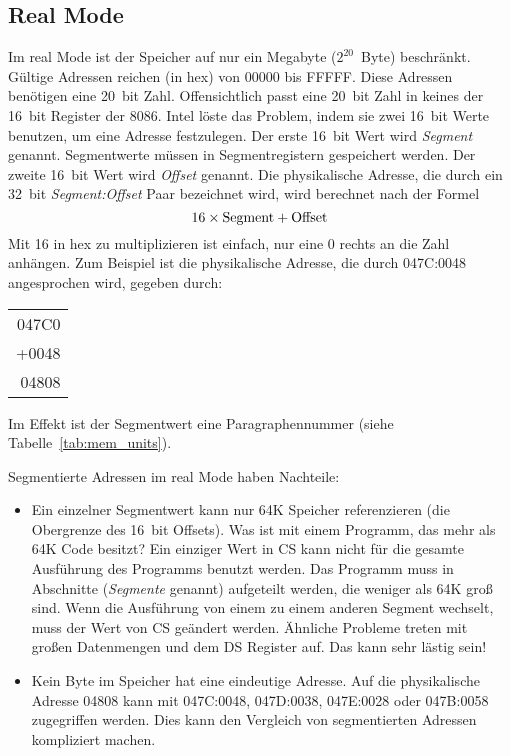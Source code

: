 \subsection{Real Mode \label{sec:real_mode} }

Im  real Mode ist der Speicher auf nur ein
Megabyte ($2^{20}$~Byte) beschr\"{a}nkt. G\"{u}ltige Adressen reichen (in
hex) von 00000 bis FFFFF.\@  %
Diese Adressen ben\"{o}tigen eine 20~bit Zahl. Offensichtlich passt eine
20~bit Zahl in keines der 16~bit Register der 8086. Intel l\"{o}ste das
Problem, indem sie zwei 16~bit Werte benutzen, um eine Adresse
festzulegen. Der erste 16~bit Wert wird \emph{Segment} genannt.
Segmentwerte m\"{u}ssen in Segmentregistern gespeichert werden. Der
zweite 16~bit Wert wird \emph{Offset} genannt. Die physikalische
Adresse, die durch ein 32~bit \emph{Segment:Offset} Paar bezeichnet
wird, wird berechnet nach der Formel
\[ 16 \times {\rm Segment} + {\rm Offset} \]
Mit 16 in hex zu multiplizieren ist einfach, nur eine 0 rechts an
die Zahl anh\"{a}ngen. Zum Beispiel ist die physikalische Adresse, die
durch 047C:0048 angesprochen wird, gegeben durch:
\begin{center}
\begin{tabular}{r}
 047C0 \\
 +0048 \\
\hline
 04808 \\
\end{tabular}
\end{center}
Im Effekt ist der Segmentwert eine Paragraphennummer (siehe
Tabelle~\ref{tab:mem_units}).

Segmentierte Adressen im real Mode haben Nachteile:
\begin{itemize}
\parskip=-0.25em %

\item Ein einzelner Segmentwert kann nur 64K Speicher referenzieren (die
Obergrenze des 16~bit Offsets). Was ist mit einem Programm, das mehr
als 64K Code besitzt? Ein einziger Wert in CS kann nicht f\"{u}r die
gesamte Ausf\"{u}hrung des Programms benutzt werden. Das Programm muss
in Abschnitte (\emph{Segmente}  genannt)
aufgeteilt werden, die weniger als 64K gro{\ss} sind. Wenn die
Ausf\"{u}hrung von einem zu einem anderen Segment wechselt, muss der
Wert von CS ge\"{a}ndert werden. \"{A}hnliche Probleme treten mit gro{\ss}en
Datenmengen und dem DS Register auf. Das kann sehr l\"{a}stig sein!

\item Kein Byte im Speicher hat eine eindeutige Adresse. Auf die
physikalische Adresse 04808 kann mit 047C:0048, 047D:0038, 047E:0028
oder 047B:0058 zugegriffen werden. Dies kann den Vergleich von
segmentierten Adressen kompliziert machen.

\end{itemize}

